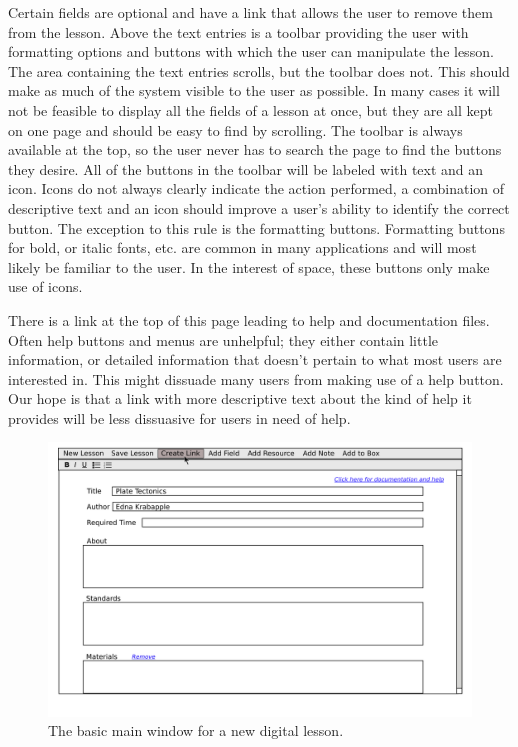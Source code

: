 \documentclass[10pt,letter]{article}
\begin{document}
Certain fields are optional and have a link that allows the user to remove them
from the lesson. Above the text entries is a toolbar providing the user with
formatting options and buttons with which the user can manipulate the lesson.
The area containing the text entries scrolls, but the toolbar does not. This
should make as much of the system visible to the user as possible. In many cases
it will not be feasible to display all the fields of a lesson at once, but they
are all kept on one page and should be easy to find by scrolling. The toolbar is
always available at the top, so the user never has to search the page to find
the buttons they desire. All of the buttons in the toolbar will be labeled with
text and an icon. Icons do not always clearly indicate the action performed, a
combination of descriptive text and an icon should improve a user's ability to
identify the correct button. The exception to this rule is the formatting
buttons. Formatting buttons for bold, or italic fonts, etc. are common in many
applications and will most likely be familiar to the user. In the interest of
space, these buttons only make use of icons.

There is a link at the top of this page leading to help and documentation files.
Often help buttons and menus are unhelpful; they either contain little
information, or detailed information that doesn't pertain to what most users are
interested in. This might dissuade many users from making use of a help button.
Our hope is that a link with more descriptive text about the kind of help it
provides will be less dissuasive for users in need of help.

\begin{figure}
	\centering
	\includegraphics[width=0.9\linewidth]{../../low-fi_prototype/button_mouseover}
	\caption{The basic main window for a new digital lesson.}
	\label{fig: main window}
\end{figure}
\end{document}
